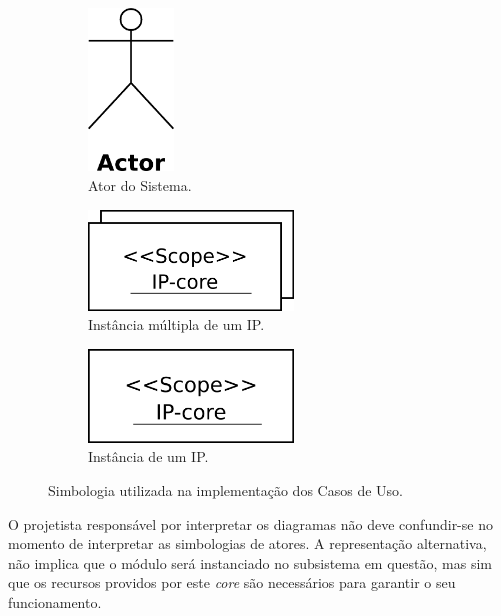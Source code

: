 \documentclass{article}
\begin{document}
  \FloatBarrier
  \begin{figure}[H]
    \centering
    \begin{subfigure}[b]{0.3\textwidth}
      \centering
      \includegraphics[width=0.25\textwidth]{actor_exemple.png}
      \caption{Ator do Sistema.}
      \label{fig:actor_exemple}
    \end{subfigure} 
    \begin{subfigure}[b]{0.3\textwidth}
      \centering
      \includegraphics[width=0.6\textwidth]{ipcore_exemple.png}
      \caption{Instância múltipla de um IP.}
      \label{fig:ipcore_exemple}
    \end{subfigure}
    \begin{subfigure}[b]{0.3\textwidth}
      \centering
      \includegraphics[width=0.6\textwidth]{ipcore_single_exemple.png}
      \caption{Instância de um IP.}
      \label{fig:ipcore_single_exemple}
    \end{subfigure}
    \caption{Simbologia utilizada na implementação dos Casos de Uso.}
    \label{fig:actors}
  \end{figure}
  
  O projetista responsável por interpretar os diagramas não deve confundir-se no momento de interpretar as simbologias de atores. A representação alternativa, não implica que o módulo será instanciado no subsistema em questão, mas sim que os recursos providos por este \textit{core} são necessários para garantir o seu funcionamento.
  
\end{document}
